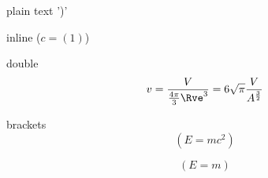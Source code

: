 plain text ')'

inline ($c = (1)$)

double $$v = \frac{V}{\frac{4\pi}{3}\Rve^3} = 6\sqrt{\pi} \frac{V}{A^{\frac{3}{2}}}$$

brackets \[(E=mc^2)\]

\begin{equation}
(E=m)
\end{equation}
